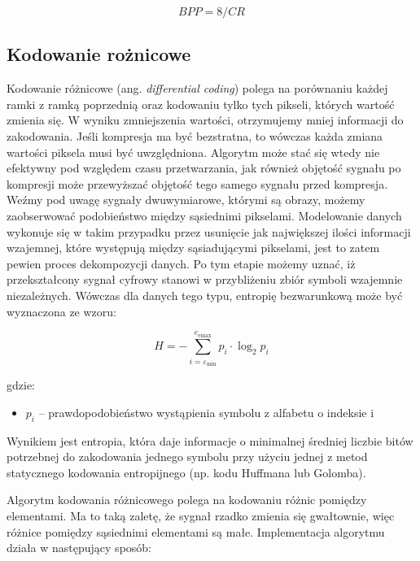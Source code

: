 \documentclass{article}
\begin{document}
\begin{equation}
  BPP = 8 / CR
\end{equation}


\subsection{Kodowanie rożnicowe}
\label{sec:roznicowe}

Kodowanie różnicowe (ang. \emph{differential coding}) polega na porównaniu każdej ramki z ramką
poprzednią oraz kodowaniu tylko tych pikseli, których wartość zmienia się. W wyniku
zmniejszenia wartości, otrzymujemy mniej informacji do zakodowania. Jeśli kompresja ma
być bezstratna, to wówczas każda zmiana wartości piksela musi być uwzględniona. Algorytm może stać się wtedy nie efektywny pod względem czasu przetwarzania, jak również objętość sygnału po kompresji może przewyższać objętość tego samego sygnału przed kompresja.  Weźmy pod uwagę sygnały dwuwymiarowe, którymi są obrazy, możemy zaobserwować podobieństwo między sąsiednimi pikselami. Modelowanie danych wykonuje się w takim przypadku przez usunięcie jak największej ilości informacji wzajemnej, które występują między sąsiadującymi pikselami, jest to zatem pewien proces dekompozycji danych. Po tym etapie możemy uznać, iż przekształcony sygnał cyfrowy stanowi w przybliżeniu zbiór symboli wzajemnie niezależnych. Wówczas dla danych tego typu, entropię bezwarunkową może być wyznaczona ze wzoru:

\begin{equation}
    \label{eq:entropia}
    H = -\sum_{i=\varepsilon_{\textrm{min}}}^{e_{\textrm{emax}}} p_{i} \cdot \log_{2} p_{i}
\end{equation}

gdzie:
\begin{itemize}[label=]
 \item $p_i$ -- prawdopodobieństwo wystąpienia symbolu z alfabetu o indeksie i
\end{itemize}

Wynikiem jest entropia, która daje informacje o minimalnej średniej liczbie bitów potrzebnej do zakodowania jednego symbolu przy użyciu jednej z metod statycznego kodowania entropijnego (np. kodu Huffmana lub Golomba).

Algorytm kodowania różnicowego polega na kodowaniu różnic pomiędzy elementami. Ma to taką zaletę, że sygnał rzadko zmienia się gwałtownie, więc różnice pomiędzy sąsiednimi elementami są małe. Implementacja algorytmu działa w następujący sposób:
\end{document}

